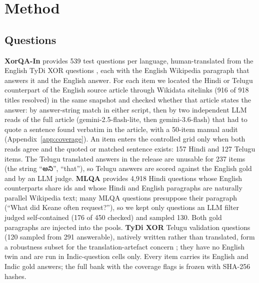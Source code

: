 \section{Method}
\label{sec:method}

\subsection{Questions}
\label{sec:questions}
\textbf{XorQA-In} \citep{a2404_16816} provides 539 test questions per language, human-translated from the English TyDi XOR questions \citep{a2010_11856}, each with the English Wikipedia paragraph that answers it and the English answer. For each item we located the Hindi or Telugu counterpart of the English source article through Wikidata sitelinks (916 of 918 titles resolved) in the same snapshot and checked whether that article states the answer: by answer-string match in either script, then by two independent LLM reads of the full article (gemini-2.5-flash-lite, then gemini-3.6-flash) that had to quote a sentence found verbatim in the article, with a 50-item manual audit (Appendix~\ref{app:coverage}). An item enters the controlled grid only when both reads agree and the quoted or matched sentence exists: 157 Hindi and 127 Telugu items. The Telugu translated answers in the release are unusable for 237 items (the string ``{\telu అని}'', ``that''), so Telugu answers are scored against the English gold and by an LLM judge. \textbf{MLQA} \citep{a1910_07475} provides 4{,}918 Hindi questions whose English counterparts share ids and whose Hindi and English paragraphs are naturally parallel Wikipedia text; many MLQA questions presuppose their paragraph (``What did Keane often request?''), so we kept only questions an LLM filter judged self-contained (176 of 450 checked) and sampled 130. Both gold paragraphs are injected into the pools. \textbf{TyDi XOR} Telugu validation questions (120 sampled from 291 answerable), natively written rather than translated, form a robustness subset for the translation-artefact concern \citep{a2604_24929}; they have no English twin and are run in Indic-question cells only. Every item carries its English and Indic gold answers; the full bank with the coverage flags is frozen with SHA-256 hashes.

